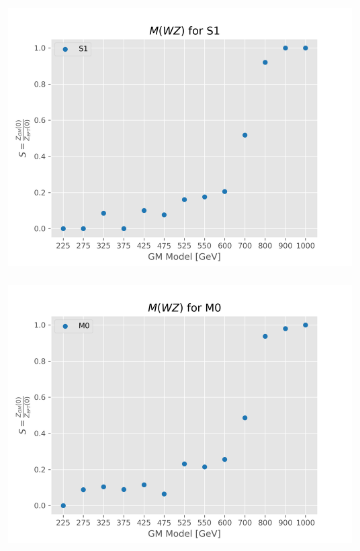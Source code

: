\documentclass[../Bachelorarbeit.tex]{subfiles}
\begin{document}
\begin{figure}[h]
    \centering
    \begin{subfigure}{0.45\textwidth}
        \includegraphics[width=\textwidth]{Plots/gm_relevanze/MTWZ_op_S1.png}
    \end{subfigure}
    \begin{subfigure}{0.45\textwidth}
        \includegraphics[width=\textwidth]{Plots/gm_relevanze/MTWZ_op_M0.png}
    \end{subfigure}
    \begin{subfigure}{0.45\textwidth}

\end{subfigure}
\end{figure}
\end{document}
